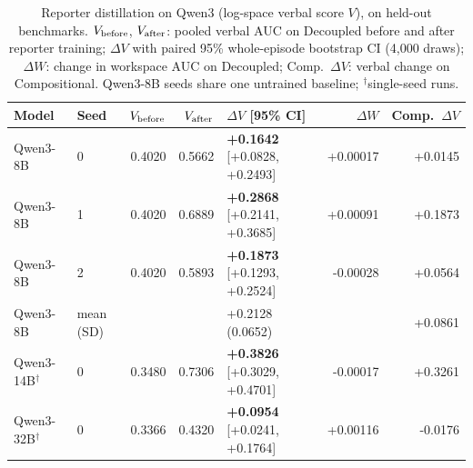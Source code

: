 \begin{table}[tbp]
\centering
\caption{Reporter distillation on Qwen3 (log-space verbal score $V$), on held-out benchmarks. $V_{\rm before}$, $V_{\rm after}$: pooled verbal AUC on Decoupled before and after reporter training; $\Delta V$ with paired 95\% whole-episode bootstrap CI (4,000 draws); $\Delta W$: change in workspace AUC on Decoupled; Comp.\ $\Delta V$: verbal change on Compositional. Qwen3-8B seeds share one untrained baseline; $^{\dagger}$single-seed runs.}
\label{tab:alignment}
\footnotesize
\setlength{\tabcolsep}{4pt}
\begin{tabular}{llrrlrr}
\toprule
Model & Seed & $V_{\rm before}$ & $V_{\rm after}$ & $\Delta V$ [95\% CI] & $\Delta W$ & Comp.\ $\Delta V$ \\
\midrule
Qwen3-8B & 0 & 0.4020 & 0.5662 & \textbf{+0.1642} [+0.0828, +0.2493] & +0.00017 & +0.0145 \\
Qwen3-8B & 1 & 0.4020 & 0.6889 & \textbf{+0.2868} [+0.2141, +0.3685] & +0.00091 & +0.1873 \\
Qwen3-8B & 2 & 0.4020 & 0.5893 & \textbf{+0.1873} [+0.1293, +0.2524] & -0.00028 & +0.0564 \\
Qwen3-8B & mean (SD) & & & +0.2128 (0.0652) & & +0.0861 \\
\addlinespace
Qwen3-14B$^{\dagger}$ & 0 & 0.3480 & 0.7306 & \textbf{+0.3826} [+0.3029, +0.4701] & -0.00017 & +0.3261 \\
Qwen3-32B$^{\dagger}$ & 0 & 0.3366 & 0.4320 & \textbf{+0.0954} [+0.0241, +0.1764] & +0.00116 & -0.0176 \\
\bottomrule
\end{tabular}
\end{table}
